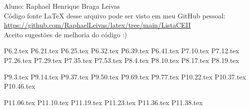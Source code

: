 \documentclass[12pt]{scrartcl}
\begin{document}
Aluno: Raphael Henrique Braga Leivas \\[20pt]
Código fonte LaTeX desse arquivo pode ser visto em meu GitHub pessoal: \\[10pt]
\href{https://github.com/RaphaelLeivas/latex/tree/main/ListaCEII}{https://github.com/RaphaelLeivas/latex/tree/main/ListaCEII} \\[20pt]
Aceito sugestões de melhoria do código :) 

{P6.2.tex}
{P6.21.tex}
{P6.25.tex}
{P6.32.tex}
{P6.39.tex}
{P6.41.tex}
{P7.10.tex}
{P7.12.tex}
{P7.26.tex}
{P7.29.tex}
{P7.35.tex}
{P7.53.tex}
{P8.4.tex}
{P8.10.tex}
{P8.17.tex}
{P8.19.tex}

{P9.3.tex}
{P9.14.tex}
{P9.37.tex}
{P9.50.tex}
{P9.69.tex}
{P9.77.tex}
{P10.22.tex}
{P10.37.tex}
{P10.46.tex}

{P11.06.tex}
{P11.10.tex}
{P11.19.tex}
{P11.23.tex}
{P11.36.tex}
{P11.38.tex}
\end{document}
